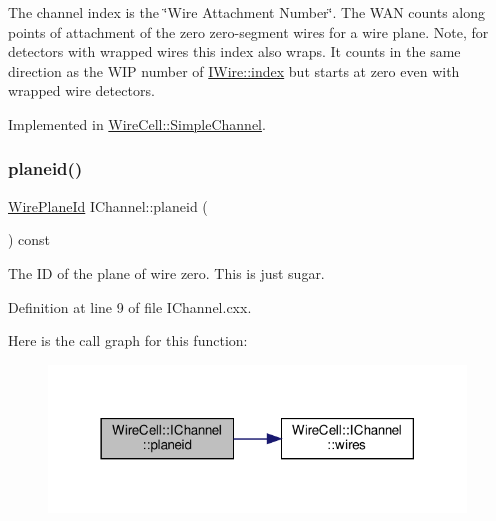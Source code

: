 The channel index is the \char`\"{}\+Wire Attachment Number\char`\"{}. The W\+AN counts along points of attachment of the zero\textquotesingle{} zero-\/segment wires for a wire plane. Note, for detectors with wrapped wires this index also wraps. It counts in the same direction as the W\+IP number of \hyperlink{class_wire_cell_1_1_i_wire_abe81fe1d38c3d0a73e812e765f2081cd}{I\+Wire\+::index} but starts at zero even with wrapped wire detectors. 

Implemented in \hyperlink{class_wire_cell_1_1_simple_channel_af16019937e1b8fb48860f405c4607757}{Wire\+Cell\+::\+Simple\+Channel}.

\mbox{\label{class_wire_cell_1_1_i_channel_abfb090d07e74573c9cf633695ca73927}} 
\subsubsection{\texorpdfstring{planeid()}{planeid()}}
{\footnotesize\ttfamily \hyperlink{class_wire_cell_1_1_wire_plane_id}{Wire\+Plane\+Id} I\+Channel\+::planeid (\begin{DoxyParamCaption}{ }\end{DoxyParamCaption}) const\hspace{0.3cm}{\ttfamily [virtual]}}



The ID of the plane of wire zero. This is just sugar. 



Definition at line 9 of file I\+Channel.\+cxx.

Here is the call graph for this function\+:
\nopagebreak
\begin{figure}[H]
\begin{center}
\leavevmode
\includegraphics[width=314pt]{class_wire_cell_1_1_i_channel_abfb090d07e74573c9cf633695ca73927_cgraph}
\end{center}
\end{figure}
\mbox{\label{class_wire_cell_1_1_i_channel_a699d41be0c4e79f99dfef3b69394cf52}} 
